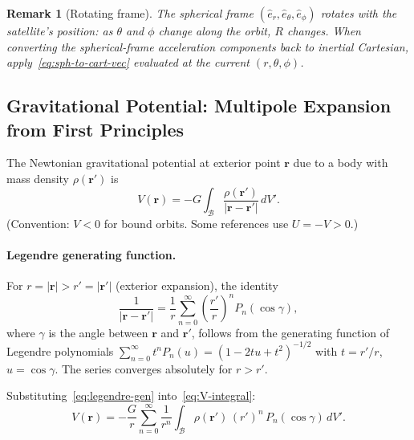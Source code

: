 \documentclass[11pt]{article}
\newtheorem{remark}{Remark}
\begin{document}
\begin{remark}[Rotating frame]
  The spherical frame $(\hat{e}_r,\hat{e}_\theta,\hat{e}_\phi)$ rotates
  with the satellite's position: as $\theta$ and $\phi$ change along the
  orbit, $R$ changes.  When converting the spherical-frame acceleration
  components back to inertial Cartesian, apply~\eqref{eq:sph-to-cart-vec}
  evaluated at the \emph{current} $(r,\theta,\phi)$.
\end{remark}

\subsection{Gravitational Potential: Multipole Expansion from First Principles}
\label{ssec:multipole}

The Newtonian gravitational potential at exterior point $\mathbf{r}$ due to a
body with mass density $\rho(\mathbf{r}')$ is
\begin{equation}
  V(\mathbf{r})
  = -G\int_{\mathcal{B}} \frac{\rho(\mathbf{r}')}{|\mathbf{r}-\mathbf{r}'|}\,dV'.
  \label{eq:V-integral}
\end{equation}
(Convention: $V < 0$ for bound orbits.  Some references use $U = -V > 0$.)

\paragraph{Legendre generating function.}
For $r = |\mathbf{r}| > r' = |\mathbf{r}'|$ (exterior expansion), the identity
\begin{equation}
  \frac{1}{|\mathbf{r}-\mathbf{r}'|}
  = \frac{1}{r}\sum_{n=0}^\infty
    \left(\frac{r'}{r}\right)^n P_n(\cos\gamma),
  \label{eq:legendre-gen}
\end{equation}
where $\gamma$ is the angle between $\mathbf{r}$ and $\mathbf{r}'$, follows from
the generating function of Legendre polynomials
$\sum_{n=0}^\infty t^n P_n(u) = (1-2tu+t^2)^{-1/2}$ with $t=r'/r$,
$u=\cos\gamma$.  The series converges absolutely for $r > r'$.

Substituting~\eqref{eq:legendre-gen} into~\eqref{eq:V-integral}:
\begin{equation}
  V(\mathbf{r})
  = -\frac{G}{r}\sum_{n=0}^\infty \frac{1}{r^n}
    \int_{\mathcal{B}} \rho(\mathbf{r}')\,(r')^n\,P_n(\cos\gamma)\,dV'.
  \label{eq:V-series-gamma}
\end{equation}
\end{document}
